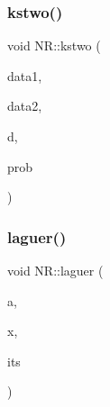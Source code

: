 \subsubsection{\texorpdfstring{kstwo()}{kstwo()}}
{\footnotesize\ttfamily void N\+R\+::kstwo (\begin{DoxyParamCaption}\item[{\mbox{\hyperlink{namespaceNR_ab293e06a6bf799d8a7ed932b6852bcb8}{Vec\+\_\+\+I\+O\+\_\+\+DP}} \&}]{data1,  }\item[{\mbox{\hyperlink{namespaceNR_ab293e06a6bf799d8a7ed932b6852bcb8}{Vec\+\_\+\+I\+O\+\_\+\+DP}} \&}]{data2,  }\item[{\mbox{\hyperlink{namespaceNR_af6ff762dd605ff477b8e52387253a02a}{DP}} \&}]{d,  }\item[{\mbox{\hyperlink{namespaceNR_af6ff762dd605ff477b8e52387253a02a}{DP}} \&}]{prob }\end{DoxyParamCaption})}

\mbox{\label{namespaceNR_aa2ea67c46e74229112bf024cfb9f6181}} 
\subsubsection{\texorpdfstring{laguer()}{laguer()}}
{\footnotesize\ttfamily void N\+R\+::laguer (\begin{DoxyParamCaption}\item[{\mbox{\hyperlink{namespaceNR_ad1b14bf0517c78cb2e0c1407b08ba92b}{Vec\+\_\+\+I\+\_\+\+C\+P\+L\+X\+\_\+\+DP}} \&}]{a,  }\item[{std\+::complex$<$ \mbox{\hyperlink{namespaceNR_af6ff762dd605ff477b8e52387253a02a}{DP}} $>$ \&}]{x,  }\item[{int \&}]{its }\end{DoxyParamCaption})}

\mbox{\label{namespaceNR_a0e8872f893cfdae1552954ed0ed82903}} 
